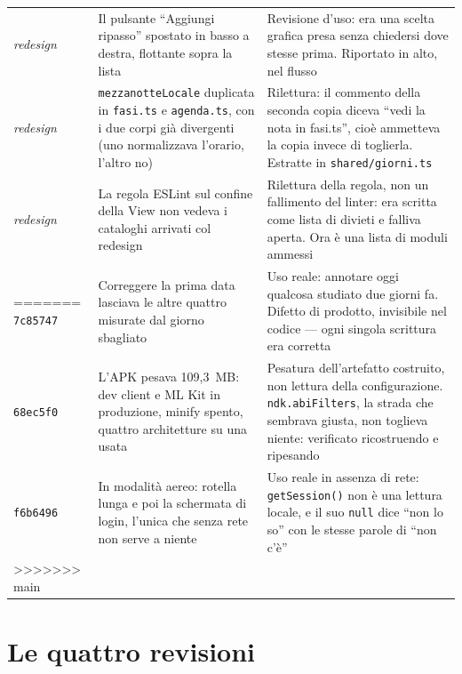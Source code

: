 \documentclass[11pt,a4paper]{report}
\begin{document}
\begin{center}
\begin{tabular}{@{}p{1.5cm}p{5.4cm}p{7.7cm}@{}}
\addlinespace
\emph{redesign} & Il pulsante ``Aggiungi ripasso'' spostato in basso a destra,
  flottante sopra la lista & Revisione d'uso: era una scelta grafica presa
  senza chiedersi dove stesse prima. Riportato in alto, nel flusso \\
\addlinespace
\emph{redesign} & \texttt{mezzanotteLocale} duplicata in \texttt{fasi.ts} e
  \texttt{agenda.ts}, con i due corpi gi\`a divergenti (uno normalizzava
  l'orario, l'altro no) & Rilettura: il commento della seconda copia diceva
  ``vedi la nota in fasi.ts'', cio\`e ammetteva la copia invece di toglierla.
  Estratte in \texttt{shared/giorni.ts} \\
\addlinespace
\emph{redesign} & La regola ESLint sul confine della View non vedeva i
  cataloghi arrivati col redesign & Rilettura della regola, non un
  fallimento del linter: era scritta come lista di divieti e falliva aperta.
  Ora \`e una lista di moduli ammessi \\
=======
\texttt{7c85747} & Correggere la prima data lasciava le altre quattro misurate
  dal giorno sbagliato & Uso reale: annotare oggi qualcosa studiato due giorni
  fa. Difetto di prodotto, invisibile nel codice --- ogni singola scrittura era
  corretta \\
\addlinespace
\texttt{68ec5f0} & L'APK pesava 109,3~MB: dev client e ML Kit in produzione,
  minify spento, quattro architetture su una usata & Pesatura dell'artefatto
  costruito, non lettura della configurazione. \texttt{ndk.abiFilters}, la
  strada che sembrava giusta, non toglieva niente: verificato ricostruendo e
  ripesando \\
\addlinespace
\texttt{f6b6496} & In modalit\`a aereo: rotella lunga e poi la schermata di
  login, l'unica che senza rete non serve a niente & Uso reale in assenza di
  rete: \texttt{getSession()} non \`e una lettura locale, e il suo
  \texttt{null} dice ``non lo so'' con le stesse parole di ``non c'\`e'' \\
>>>>>>> main
\bottomrule
\end{tabular}
\end{center}

\section{Le quattro revisioni}
\end{document}
